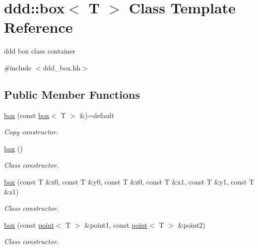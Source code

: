 \hypertarget{classddd_1_1box}{}\section{ddd\+:\+:box$<$ T $>$ Class Template Reference}
\label{classddd_1_1box}


ddd box class container  




{\ttfamily \#include $<$ddd\+\_\+box.\+hh$>$}

\subsection*{Public Member Functions}
\begin{DoxyCompactItemize}
\item 
\mbox{\label{classddd_1_1box_ae36d1565ad1e59e45329aa15d879017d}} 
\hyperlink{classddd_1_1box_ae36d1565ad1e59e45329aa15d879017d}{box} (const \hyperlink{classddd_1_1box}{box}$<$ T $>$ \&)=default
\begin{DoxyCompactList}\small\item\em Copy constructor. \end{DoxyCompactList}\item 
\mbox{\label{classddd_1_1box_abe0d38e4c4380bf430a4781c8c0ed8f6}} 
\hyperlink{classddd_1_1box_abe0d38e4c4380bf430a4781c8c0ed8f6}{box} ()
\begin{DoxyCompactList}\small\item\em Class constructor. \end{DoxyCompactList}\item 
\mbox{\label{classddd_1_1box_a5f4d57343779a88663aead8580127175}} 
\hyperlink{classddd_1_1box_a5f4d57343779a88663aead8580127175}{box} (const T \&x0, const T \&y0, const T \&z0, const T \&x1, const T \&y1, const T \&z1)
\begin{DoxyCompactList}\small\item\em Class constructor. \end{DoxyCompactList}\item 
\hyperlink{classddd_1_1box_afb3bf0799aac08e5b58dbb955be99a78}{box} (const \hyperlink{classddd_1_1point}{point}$<$ T $>$ \&point1, const \hyperlink{classddd_1_1point}{point}$<$ T $>$ \&point2)
\begin{DoxyCompactList}\small\item\em Class constructor. \end{DoxyCompactList}\item 

\end{DoxyCompactItemize}
